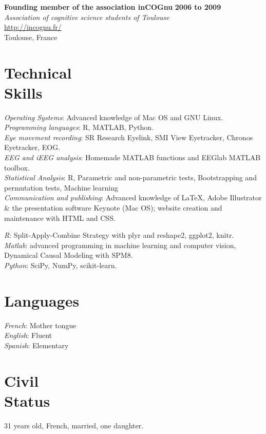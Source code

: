 \documentclass[margin,line]{resume}
\begin{document}
\begin{resume}
	\textbf{Founding member of the association inCOGnu} \hfill \textbf{2006 to 2009}\\
	\textsl{Association of cognitive science students of Toulouse}\\
	 \url{http://incognu.fr/}\\
	Toulouse, France


\vspace{3mm}
    \section{\mysidestyle Technical\\Skills}

	\textsl{Operating Systems}: Advanced knowledge of Mac OS and GNU Linux.\\
	\textsl{Programming languages}: R, MATLAB, Python.\\
	\textsl{Eye movement recording}: SR Research Eyelink, SMI View Eyetracker, Chronos Eyetracker, EOG.\\
	\textsl{EEG and iEEG analysis}: Homemade MATLAB functions and EEGlab MATLAB toolbox.\\
	\textsl{Statistical Analysis}: R, Parametric and non-parametric tests, Bootstrapping and permutation tests, Machine learning\\
	\textsl{Communication and publishing}: Advanced knowledge of \LaTeX, Adobe Illustrator \& the presentation software Keynote (Mac OS); website creation and maintenance with HTML and CSS.

\textsl{R}: Split-Apply-Combine Strategy with plyr and reshape2, ggplot2, knitr.\\
\textsl{Matlab}: advanced programming in machine learning and computer vision, Dynamical Causal Modeling with SPM8.\\
\textsl{Python}: SciPy, NumPy, scikit-learn.\\

\vspace{3mm}
    \section{\mysidestyle Languages}
	\textsl{French}: Mother tongue\\
	\textsl{English}: Fluent\\
	\textsl{Spanish}: Elementary

    \section{\mysidestyle Civil\\Status}
    31 years old, French, married, one daughter.	


\end{resume}
\end{document}
